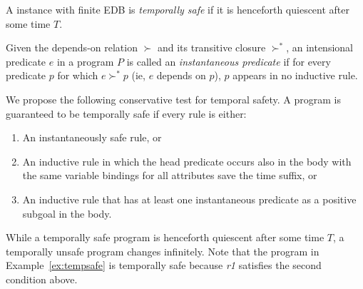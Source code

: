 \begin{definition}
%
A \slang instance with finite EDB is \emph{temporally safe} if it is henceforth
quiescent after some time $T$.
%
\end{definition}

\begin{definition}
%
Given the depends-on relation $\succ$ and its transitive closure $\succ^{*}$,
an intensional predicate $e$ in a program $P$ is called an \emph{instantaneous
predicate} if for every predicate $p$ for which $e \succ^{*} p$ (ie, $e$
depends on $p$), $p$ appears in no inductive rule.
\end{definition}

We propose the following conservative test for temporal safety.  A program is
guaranteed to be temporally safe if every rule is either:

\begin{enumerate}
%
\item An instantaneously safe rule, or
%
\item An inductive rule in which the head predicate occurs also in the
body with the same variable bindings for all attributes save the time suffix,
or
%
\item An inductive rule that has at least one instantaneous predicate as a
positive subgoal in the body.
%
\end{enumerate}


While a temporally safe program is henceforth quiescent after some time $T$,
a temporally unsafe program changes infinitely.  Note that
the \slang program in Example~\ref{ex:tempsafe} is temporally safe because
\emph{r1} satisfies the second condition above.

